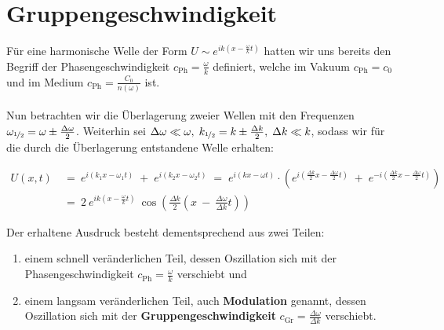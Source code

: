 \section{Gruppengeschwindigkeit}

Für eine harmonische Welle der Form $U \sim e^{ik(x-\frac{\omega}{k}t)}$ hatten wir uns bereits den Begriff der Phasengeschwindigkeit $c_{\text{Ph}} = \frac{\omega}{k}$ definiert, welche im Vakuum $c_{\text{Ph}}=c_0$ und im Medium $c_{\text{Ph}}= \frac{C_0}{n(\omega)}$ ist.\\
\ \\
Nun betrachten wir die Überlagerung zweier Wellen mit den Frequenzen $\omega_{\nicefrac{1}{2}} = \omega \pm \frac{\Delta\omega}{2}$. Weiterhin sei $\Delta\omega\ll\omega, \; k_{\nicefrac{1}{2}} = k \pm \frac{\Delta k}{2}, \; \Delta k \ll k$, sodass wir für die durch die Überlagerung entstandene Welle erhalten:

\begin{align*}
U(x,t) \ &= \ e^{i(k_1 x -\omega_1 t)} \; + \; e^{i(k_2 x - \omega_2 t)} \; = \; e^{i(kx-\omega t)} \cdot \left(e^{i\left(\frac{\Delta k}{2}x - \frac{\Delta \omega}{2}t \right)} \; + \; e^{-i\left(\frac{\Delta k}{2}x - \frac{\Delta \omega}{2}t\right)}\right)\\
&= \ 2 \ e^{ik(x-\frac{\omega}{k} t)} \ \cos\left(\frac{\Delta k}{2}\left(x \ - \ \frac{\Delta \omega}{\Delta k}t\right)\right)
\end{align*}

Der erhaltene Ausdruck besteht dementsprechend aus zwei Teilen:\\
\begin{enumerate}[label=\roman*)]
\item einem schnell veränderlichen Teil, dessen Oszillation sich mit der Phasengeschwindigkeit $c_{\text{Ph}} =\frac{\omega}{k}$ verschiebt und

\item einem langsam veränderlichen Teil, auch \textbf{Modulation} genannt, dessen Oszillation sich mit der \textbf{Gruppengeschwindigkeit} $c_{\text{Gr}} = \frac{\Delta \omega}{\Delta k}$ verschiebt.
\end{enumerate}

